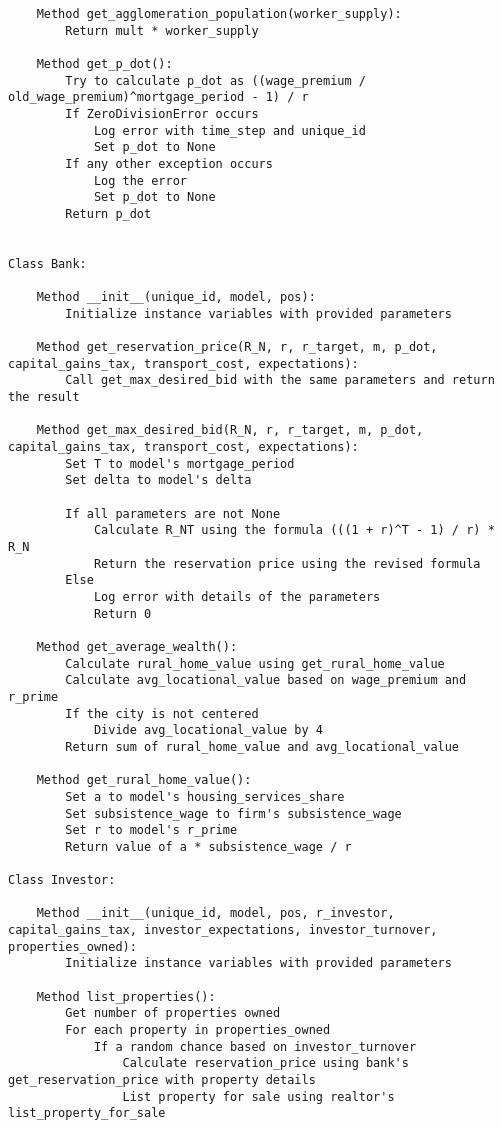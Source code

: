 {\begin{verbatim}
    Method get_agglomeration_population(worker_supply):
        Return mult * worker_supply

    Method get_p_dot():
        Try to calculate p_dot as ((wage_premium / old_wage_premium)^mortgage_period - 1) / r
        If ZeroDivisionError occurs
            Log error with time_step and unique_id
            Set p_dot to None
        If any other exception occurs
            Log the error
            Set p_dot to None
        Return p_dot


Class Bank:

    Method __init__(unique_id, model, pos):
        Initialize instance variables with provided parameters

    Method get_reservation_price(R_N, r, r_target, m, p_dot, capital_gains_tax, transport_cost, expectations):
        Call get_max_desired_bid with the same parameters and return the result

    Method get_max_desired_bid(R_N, r, r_target, m, p_dot, capital_gains_tax, transport_cost, expectations):
        Set T to model's mortgage_period
        Set delta to model's delta

        If all parameters are not None
            Calculate R_NT using the formula (((1 + r)^T - 1) / r) * R_N
            Return the reservation price using the revised formula
        Else
            Log error with details of the parameters
            Return 0

    Method get_average_wealth():
        Calculate rural_home_value using get_rural_home_value
        Calculate avg_locational_value based on wage_premium and r_prime
        If the city is not centered
            Divide avg_locational_value by 4
        Return sum of rural_home_value and avg_locational_value

    Method get_rural_home_value():
        Set a to model's housing_services_share
        Set subsistence_wage to firm's subsistence_wage
        Set r to model's r_prime
        Return value of a * subsistence_wage / r

Class Investor:

    Method __init__(unique_id, model, pos, r_investor, capital_gains_tax, investor_expectations, investor_turnover, properties_owned):
        Initialize instance variables with provided parameters

    Method list_properties():
        Get number of properties owned
        For each property in properties_owned
            If a random chance based on investor_turnover
                Calculate reservation_price using bank's get_reservation_price with property details
                List property for sale using realtor's list_property_for_sale


\end{verbatim}}
